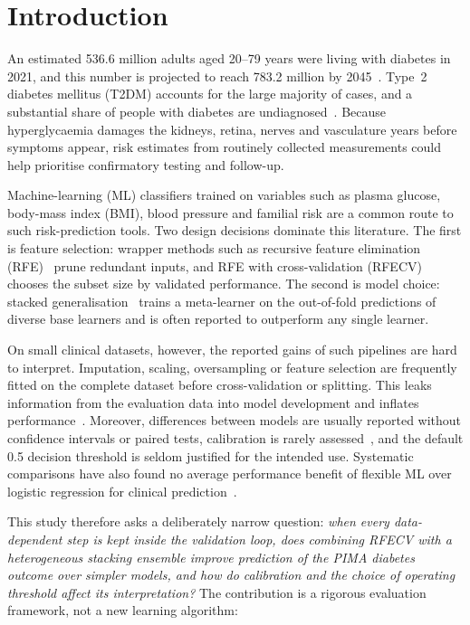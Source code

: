 \section{Introduction}
\label{sec:intro}

An estimated 536.6 million adults aged 20--79 years were living with diabetes in 2021, and this number is projected to reach 783.2 million by 2045~\cite{sun2022idf}. Type~2 diabetes mellitus (T2DM) accounts for the large majority of cases, and a substantial share of people with diabetes are undiagnosed~\cite{idf2021}. Because hyperglycaemia damages the kidneys, retina, nerves and vasculature years before symptoms appear, risk estimates from routinely collected measurements could help prioritise confirmatory testing and follow-up.

Machine-learning (ML) classifiers trained on variables such as plasma glucose, body-mass index (BMI), blood pressure and familial risk are a common route to such risk-prediction tools. Two design decisions dominate this literature. The first is feature selection: wrapper methods such as recursive feature elimination (RFE)~\cite{guyon2002rfe,kohavi1997wrappers} prune redundant inputs, and RFE with cross-validation (RFECV) chooses the subset size by validated performance. The second is model choice: stacked generalisation~\cite{wolpert1992stacked} trains a meta-learner on the out-of-fold predictions of diverse base learners and is often reported to outperform any single learner.

On small clinical datasets, however, the reported gains of such pipelines are hard to interpret. Imputation, scaling, oversampling or feature selection are frequently fitted on the complete dataset before cross-validation or splitting. This leaks information from the evaluation data into model development and inflates performance~\cite{ambroise2002selection,kaufman2012leakage,kapoor2023leakage}. Moreover, differences between models are usually reported without confidence intervals or paired tests, calibration is rarely assessed~\cite{vancalster2019calibration}, and the default 0.5 decision threshold is seldom justified for the intended use. Systematic comparisons have also found no average performance benefit of flexible ML over logistic regression for clinical prediction~\cite{christodoulou2019}.

This study therefore asks a deliberately narrow question: \emph{when every data-dependent step is kept inside the validation loop, does combining RFECV with a heterogeneous stacking ensemble improve prediction of the PIMA diabetes outcome over simpler models, and how do calibration and the choice of operating threshold affect its interpretation?} The contribution is a rigorous evaluation framework, not a new learning algorithm:

